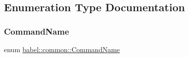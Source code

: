 \subsection{Enumeration Type Documentation}
\mbox{\label{namespacebabel_1_1common_a2d31f246c776da6bf656bd71e86cbb2c}} 
\subsubsection{\texorpdfstring{Command\+Name}{CommandName}}
{\footnotesize\ttfamily enum \mbox{\hyperlink{namespacebabel_1_1common_a2d31f246c776da6bf656bd71e86cbb2c}{babel\+::common\+::\+Command\+Name}}}

